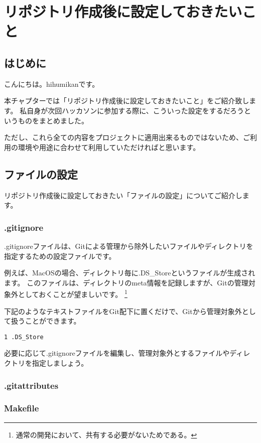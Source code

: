 \chapter{リポジトリ作成後に設定しておきたいこと}
\section{はじめに}
こんにちは。hihumikanです。

本チャプターでは「リポジトリ作成後に設定しておきたいこと」をご紹介致します。
私自身が次回ハッカソンに参加する際に、こういった設定をするだろうというものをまとめました。

ただし、これら全ての内容をプロジェクトに適用出来るものではないため、ご利用の環境や用途に合わせて利用していただければと思います。

\section{ファイルの設定}
リポジトリ作成後に設定しておきたい「ファイルの設定」についてご紹介します。

\subsection{.gitignore}
.gitignoreファイルは、Gitによる管理から除外したいファイルやディレクトリを指定するための設定ファイルです。

例えば、MacOSの場合、ディレクトリ毎に.DS\_Storeというファイルが生成されます。
このファイルは、ディレクトリのmeta情報を記録しますが、Gitの管理対象外としておくことが望ましいです。
\footnote{通常の開発において、共有する必要がないためである。}

下記のようなテキストファイルをGit配下に置くだけで、Gitから管理対象外として扱うことができます。
\begin{tcolorbox}[title=.gitignore]
  \begin{verbatim}
1 .DS_Store
\end{verbatim}
\end{tcolorbox}

必要に応じて.gitignoreファイルを編集し、管理対象外とするファイルやディレクトリを指定しましょう。

\subsection{.gitattributes}

\subsection{Makefile}
